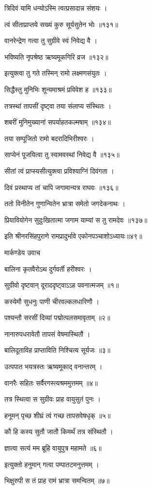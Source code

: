 त्रिदिवं यामि धन्योऽस्मि त्वत्प्रसादान्न संशयः ।

त्वं सीताप्राप्तये सख्यं कुरु सूर्यसुतेन भोः ॥१३१॥

वानरेन्द्रेण गत्वा तु सुग्रीवे स्वं निवेद्य वै ।

भविष्यति नृपश्रेष्ठ ऋष्यमूकगिरि व्रज ॥१३२॥

इत्युक्त्वा तु गते तस्मिन् रामो लक्ष्मणसंयुतः ।

सिद्धैस्तु मुनिभिः शून्यमाश्रमं प्रविवेश ह ॥१३३॥

तत्रस्थां तापसीं दृष्ट्वा तया संलाप्य संस्थितः ।

शबरीं मुनिमुख्यानां सपर्याहतकल्मषाम् ॥१३४॥

तया सम्पूजितो रामो बदरादिभिरीश्वरः ।

साप्येनं पूजयित्वा तु स्वामवस्थां निवेद्य वै ॥१३५॥

सीतां त्वं प्राप्स्यसीत्युक्त्वा प्रविश्याग्निं दिवंगता ।

दिवं प्रस्थाप्य तां चापि जगामान्यत्र राघवः ॥१३६॥

ततो विनीतेन गुणान्वितेन भ्रात्रा समेतो जगदेकनाथः ।

प्रियावियोगेन सुदुःखितात्मा जगाम याम्यां स तु रामदेवः ॥१३७॥

इति श्रीनरसिंहपुराणे रामप्रादुर्भावे एकोनपञ्चाशोऽध्यायः॥४९॥


मार्कण्डेय उवाच

बालिना कृतवैरोऽथ दुर्गवर्ती हरीश्वरः ।

सुग्रीवो दृष्टवान् दूराददृष्ट्वाऽऽह पवनात्मजम् ॥१॥

कस्येमौ सुधनुः पाणी चीरवल्कलधारिणौ ।

पश्यन्तौ सरसीं दिव्यां पद्मोत्पलसमावृताम् ॥२॥

नानारुपधरावेतौ तापसं वेषमास्थितौ ।

बालिदूताविह प्राप्ताविति निश्चित्य सूर्यजः ॥३॥

उत्पपात भयत्रस्तः ऋष्यमूकाद् वनान्तरम् ।

वानरैः सहितः सर्वैरगस्त्यश्रममुत्तमम् ॥४॥

तत्र स्थित्वा स सुग्रीवः प्राह वायुसुतं पुनः ।

हनूमन् पृच्छ शीघ्रं त्वं गच्छ तापसवेषधृक् ॥५॥

कौ हि कस्य सुतौ जातौ किमर्थं तत्र संस्थितौ ।

ज्ञात्वा सत्यं मम ब्रूहि वायुपुत्र महामते ॥६॥

इत्युक्तो हनुमान् गत्वा पम्पातटमनुत्तमम् ।

भिक्षुरुपी स तं प्राह रामं भ्रात्रा समन्वितम् ॥७॥

